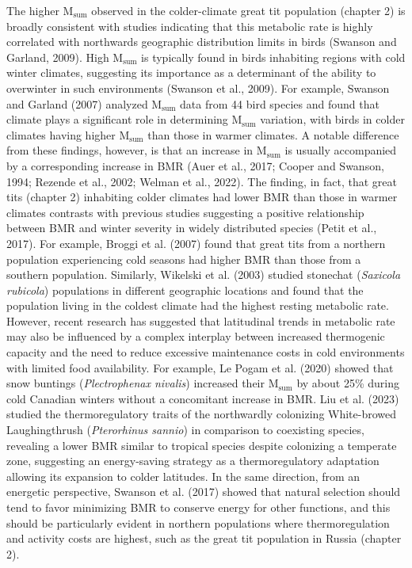 \documentclass[10pt, twoside]{book} %
\begin{document}
The higher M$_{\text{sum}}$ observed in the colder-climate great tit population (chapter 2) is broadly consistent with studies indicating that this metabolic rate is highly correlated with northwards geographic distribution limits in birds (Swanson and Garland, 2009). High M$_{\text{sum}}$ is typically found in birds inhabiting regions with cold winter climates, suggesting its importance as a determinant of the ability to overwinter in such environments (Swanson et al., 2009). For example, Swanson and Garland (2007) analyzed M$_{\text{sum}}$ data from 44 bird species and found that climate plays a significant role in determining M$_{\text{sum}}$ variation, with birds in colder climates having higher M$_{\text{sum}}$ than those in warmer climates. A notable difference from these findings, however, is that an increase in M$_{\text{sum}}$ is usually accompanied by a corresponding increase in BMR (Auer et al., 2017; Cooper and Swanson, 1994; Rezende et al., 2002; Welman et al., 2022). The finding, in fact, that great tits (chapter 2) inhabiting colder climates had lower BMR than those in warmer climates contrasts with previous studies suggesting a positive relationship between BMR and winter severity in widely distributed species (Petit et al., 2017). For example, Broggi et al. (2007) found that great tits from a northern population experiencing cold seasons had higher BMR than those from a southern population. Similarly, Wikelski et al. (2003) studied stonechat (\textit{Saxicola rubicola}) populations in different geographic locations and found that the population living in the coldest climate had the highest resting metabolic rate. However, recent research has suggested that latitudinal trends in metabolic rate may also be influenced by a complex interplay between increased thermogenic capacity and the need to reduce excessive maintenance costs in cold environments with limited food availability. For example, Le Pogam et al. (2020) showed that snow buntings (\textit{Plectrophenax nivalis}) increased their M$_{\text{sum}}$ by about 25\% during cold Canadian winters without a concomitant increase in BMR. Liu et al. (2023) studied the thermoregulatory traits of the northwardly colonizing White-browed Laughingthrush (\textit{Pterorhinus sannio}) in comparison to coexisting species, revealing a lower BMR similar to tropical species despite colonizing a temperate zone, suggesting an energy-saving strategy as a thermoregulatory adaptation allowing its expansion to colder latitudes. In the same direction, from an energetic perspective, Swanson et al. (2017) showed that natural selection should tend to favor minimizing BMR to conserve energy for other functions, and this should be particularly evident in northern populations where thermoregulation and activity costs are highest, such as the great tit population in Russia (chapter 2). \\
\end{document}

